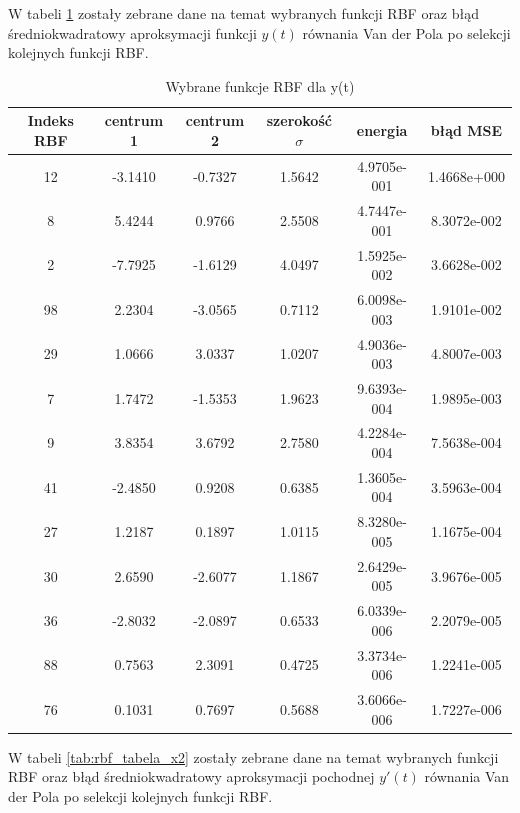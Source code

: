 W tabeli \ref{tab:rbf_tabela_x1} zostały zebrane dane na temat wybranych funkcji RBF oraz błąd średniokwadratowy aproksymacji funkcji $y(t)$ równania Van der Pola po selekcji kolejnych funkcji RBF.
\begin{table}[ht!]
\centering

\begin{tabular}{ |c| c| c| c| c| c| }
\hline
Indeks RBF & centrum 1 & centrum 2 & szerokość $\sigma$ & energia      & błąd MSE \\ \hline    
	
	12     &  -3.1410  & -0.7327   &  1.5642            & 4.9705e-001  & 1.4668e+000 \\
     8     &   5.4244  &  0.9766   &  2.5508            & 4.7447e-001  & 8.3072e-002 \\
     2     &  -7.7925  & -1.6129   &  4.0497            & 1.5925e-002  & 3.6628e-002 \\
    98     &   2.2304  & -3.0565   &  0.7112            & 6.0098e-003  & 1.9101e-002 \\
    29     &   1.0666  &  3.0337   &  1.0207            & 4.9036e-003  & 4.8007e-003 \\
     7     &   1.7472  & -1.5353   &  1.9623            & 9.6393e-004  & 1.9895e-003 \\
     9     &   3.8354  &  3.6792   &  2.7580            & 4.2284e-004  & 7.5638e-004 \\
    41     &  -2.4850  &  0.9208   &  0.6385            & 1.3605e-004  & 3.5963e-004 \\
    27     &   1.2187  &  0.1897   &  1.0115            & 8.3280e-005  & 1.1675e-004 \\
    30     &   2.6590  & -2.6077   &  1.1867            & 2.6429e-005  & 3.9676e-005 \\
    36     &  -2.8032  & -2.0897   &  0.6533            & 6.0339e-006  & 2.2079e-005 \\
    88     &   0.7563  &  2.3091   &  0.4725            & 3.3734e-006  & 1.2241e-005 \\
    76	   &   0.1031  &  0.7697   &  0.5688            & 3.6066e-006  & 1.7227e-006 \\
    \hline
\end{tabular}

\caption{Wybrane funkcje RBF dla y(t)}
\label{tab:rbf_tabela_x1}
\end{table}

W tabeli \ref{tab:rbf_tabela_x2} zostały zebrane dane na temat wybranych funkcji RBF oraz błąd średniokwadratowy aproksymacji pochodnej $y'(t)$ równania Van der Pola po selekcji kolejnych funkcji RBF.

